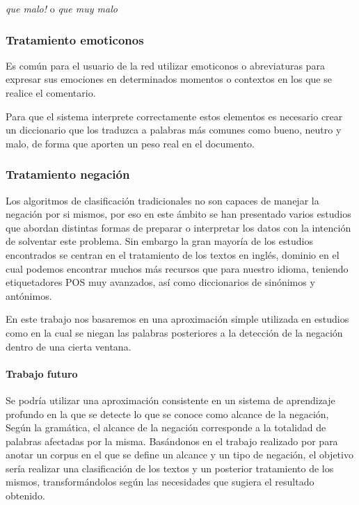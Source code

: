 \textit{ que malo! } o \textit{ que muy malo }

\subsubsection{Tratamiento emoticonos}

Es común para el usuario de la red utilizar emoticonos o abreviaturas para expresar sus emociones en determinados momentos o contextos en los que se realice el comentario.

Para que el sistema interprete correctamente estos elementos es necesario crear un diccionario que los traduzca a palabras más comunes como bueno, neutro y malo, de forma que aporten un peso real en el documento.

\subsubsection{Tratamiento negación}\label{negtrat}

Los algoritmos de clasificación tradicionales no son capaces de manejar la negación por si mismos, por eso en este ámbito se han presentado varios estudios que abordan distintas formas de preparar o interpretar los datos con la intención de solventar este problema. Sin embargo la gran mayoría de los estudios encontrados se centran en el tratamiento de los textos en inglés, dominio en el cual podemos encontrar muchos más recursos que para nuestro idioma, teniendo etiquetadores POS muy avanzados, así como diccionarios de sinónimos y antónimos.

En este trabajo nos basaremos en una aproximación simple utilizada en estudios como \cite{Coupling} \cite{Custreviews} en la cual se niegan las palabras posteriores a la detección de la negación dentro de una cierta ventana.

\paragraph{Trabajo futuro} Se podría utilizar una aproximación consistente en un sistema de aprendizaje profundo en la que se detecte lo que se conoce como alcance de la negación, Según la gramática, el alcance de la negación corresponde a la totalidad de palabras afectadas por la misma. Basándonos en el trabajo realizado por \cite{Negacion} para anotar un corpus en el que se define un alcance y un tipo de negación, el objetivo sería realizar una clasificación de los textos y un posterior tratamiento de los mismos, transformándolos según las necesidades que sugiera el resultado obtenido.


